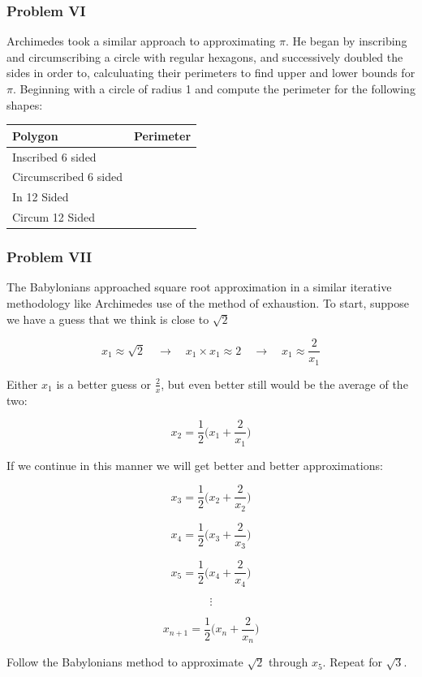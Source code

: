 \documentclass[11pt]{article}
\begin{document}
    \subsubsection{Problem VI}\label{problem-vi}

Archimedes took a similar approach to approximating \(\pi\). He began by
inscribing and circumscribing a circle with regular hexagons, and
successively doubled the sides in order to, calculuating their
perimeters to find upper and lower bounds for \(\pi\). Beginning with a
circle of radius 1 and compute the perimeter for the following shapes:

\begin{longtable}[]{@{}ll@{}}
\toprule
Polygon & Perimeter\tabularnewline
\midrule
\endhead
Inscribed 6 sided &\tabularnewline
Circumscribed 6 sided &\tabularnewline
In 12 Sided &\tabularnewline
Circum 12 Sided &\tabularnewline
\bottomrule
\end{longtable}

    \subsubsection{Problem VII}\label{problem-vii}

The Babylonians approached square root approximation in a similar
iterative methodology like Archimedes use of the method of exhaustion.
To start, suppose we have a guess that we think is close to \(\sqrt{2}\)

\[x_1 \approx \sqrt{2} \quad \rightarrow \quad x_1 \times x_1 \approx 2 \quad \rightarrow \quad x_1 \approx \frac{2}{x_1}\]

Either \(x_1\) is a better guess or \(\frac{2}{x}\), but even better
still would be the average of the two:

\[x_2 = \frac{1}{2} \big(x_1 + \frac{2}{x_1}\big)\]

If we continue in this manner we will get better and better
approximations:

\[x_3 = \frac{1}{2} \big(x_2 + \frac{2}{x_2}\big)\]

\[x_4 = \frac{1}{2} \big(x_3 + \frac{2}{x_3}\big)\]

\[x_5 = \frac{1}{2} \big(x_4 + \frac{2}{x_4}\big)\]

\[\vdots\]

\[x_{n+1} = \frac{1}{2} \big(x_n + \frac{2}{x_n}\big)\]

Follow the Babylonians method to approximate \(\sqrt{2}\) through
\(x_5\). Repeat for \(\sqrt{3}\).
\end{document}
